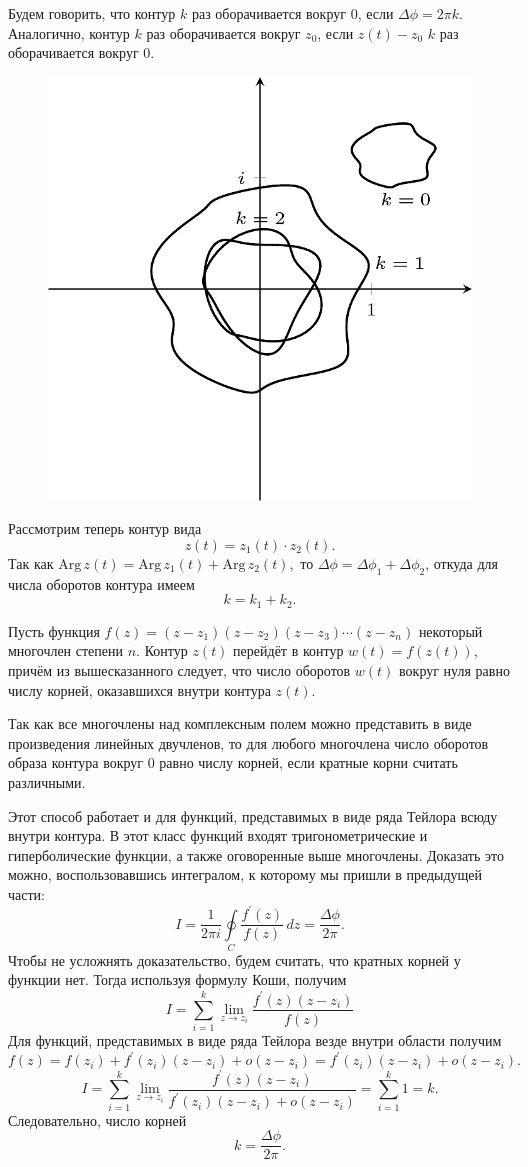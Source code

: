 Будем говорить, что контур \( k \) раз оборачивается вокруг \(0\), если
\( \Delta\phi = 2\pi k \). Аналогично, контур \( k \) раз оборачивается
вокруг \( z_0 \), если \( z(t) - z_0 \) \(k\) раз оборачивается вокруг 0.
\begin{figure}[h]
\center
\includegraphics[width=.5\textwidth]{2015-10-26-complex-roots-rotations.png}
\end{figure}

Рассмотрим теперь контур вида
\[ z(t) = z_1(t)\cdot z_2(t). \]
Так как
\( \mathrm{Arg\,} z(t) = \mathrm{Arg\,} z_1(t) + \mathrm{Arg\,} z_2(t), \)
то \( \Delta \phi = \Delta \phi_1 + \Delta \phi_2 \), откуда для числа
оборотов контура имеем
\[ k = k_1 + k_2. \]

Пусть функция \( f(z) = (z-z_1)(z-z_2)(z-z_3)\cdots(z-z_n) \) некоторый
многочлен степени \( n \). Контур \(z(t)\) перейдёт в контур \(w(t) =
f(z(t))\), причём из вышесказанного следует, что число оборотов \( w(t) \)
вокруг нуля равно числу корней, оказавшихся внутри контура \( z(t) \).

Так как все многочлены над комплексным полем можно представить в виде
произведения линейных двучленов, то для любого многочлена число оборотов образа
контура вокруг \(0\) равно числу корней, если кратные корни считать различными.

Этот способ работает и для функций, представимых в виде ряда Тейлора всюду
внутри контура. В этот класс функций входят тригонометрические и гиперболические
функции, а также оговоренные выше многочлены. Доказать это можно, воспользовавшись интегралом, к которому мы пришли в предыдущей части:
\[
    I = \frac{1}{2\pi i}\oint\limits_{C} \frac{f^\prime(z)}{f(z)}\,dz = \frac{\Delta \phi}{2\pi}.
\]
Чтобы не усложнять доказательство, будем считать, что кратных корней у функции нет. Тогда используя формулу Коши, получим
\[
  I = \sum\limits_{i=1}^k \lim_{z\to z_i} \frac{f^\prime(z)(z-z_i)}{f(z)}
\]
Для функций, представимых в виде ряда Тейлора везде внутри области получим
\[
  f(z) = f(z_i) + f^\prime(z_i)(z-z_i) + o(z-z_i) = f^\prime(z_i)(z-z_i) + o(z-z_i).
\]
\[
  I = \sum\limits_{i=1}^k \lim_{z\to z_i} \frac{f^\prime(z)(z-z_i)}{f^\prime(z_i)(z-z_i)+o(z-z_i)}= \sum\limits_{i=1}^k 1 = k.
\]
Следовательно, число корней
\[
  k = \frac{\Delta\phi}{2\pi}.
\]

